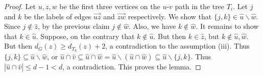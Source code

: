 \documentclass[11pt]{article}
\newcommand{\ovr}[1]{\overrightarrow{#1}}
\begin{document}
\begin{proof}
Let $u,z,w$ be the first three vertices on the $u$-$v$ path in the tree
$T_i$. Let $j$ and $k$ be the labels of edges $\ovr{uz}$ and $\ovr{zw}$
respectively. We show that $\{j,k\}\in \hat{u}\backslash \hat{w}$. Since
$j\not\in \hat{z}$, by the previous claim $j\not\in \hat{w}$. Also, we have
$k\not\in \hat{w}$. It remains to show that $k\in \hat{u}$. Suppose, on the
contrary that $k\not\in \hat{u}$. But then $k\in \hat{z}$, but $k\not\in
\hat{u},\hat{w}$. But then $d_G(z)\geq d_{T_k}(z)+2$, a contradiction to
the assumption (iii). Thus $\{j,k\}\subseteq \hat{u}\backslash \hat{w}$, or
$\hat{u}\cap \hat{v}\subseteq \hat{u}\cap \hat{w} = \hat{u}\backslash
(\hat{u}\cap \hat{w}) \subseteq \hat{u}\backslash \{j,k\}$. Thus
$|\hat{u}\cap \hat{v}|\leq d-1 < d$, a contradiction. This proves the
lemma.
\end{proof}
\end{document}
